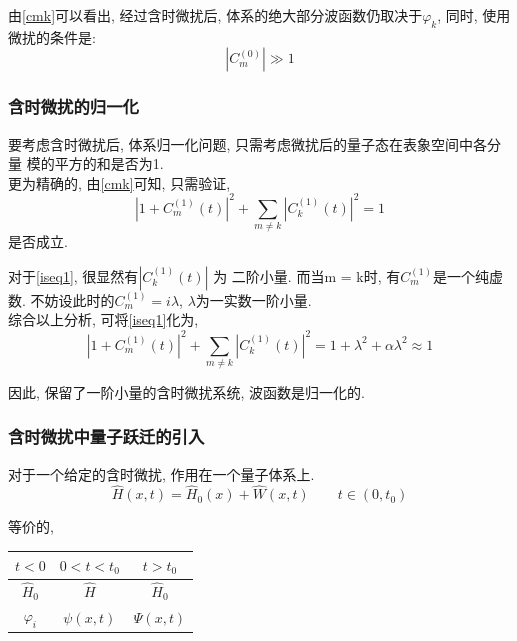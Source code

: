 \documentclass[a4paper, 11pt]{article}
\begin{document}
\begin{spacing}{1.2}
          由\eqref{cmk}可以看出, 经过含时微扰后, 体系的绝大部分波函数仍取决于$\varphi_k$,
          同时, 使用微扰的条件是:
          \begin{equation}
            |C_m^{(0)}| \gg 1
          \end{equation}
          
        \subsubsection{含时微扰的归一化}
          要考虑含时微扰后, 体系归一化问题, 只需考虑微扰后的量子态在表象空间中各分量
          模的平方的和是否为1.\\
          更为精确的, 由\eqref{cmk}可知, 只需验证,
          \begin{equation}
            \label{iseq1}
            |1+C_m^{(1)}(t)|^2 + \sum_{m\ne{}k}|C_k^{(1)}(t)|^2 = 1 
          \end{equation}
          是否成立.

          对于\eqref{iseq1}, 很显然有$|C_k^{(1)}(t)|$ 为 二阶小量. 
          而当m = k时, 有$C_m^{(1)}$是一个纯虚数.
          不妨设此时的$C_m^{(1)} = i\lambda$, $\lambda$为一实数一阶小量.\\
          综合以上分析, 可将\eqref{iseq1}化为, 
          \begin{equation}
            |1+C_m^{(1)}(t)|^2 + \sum_{m\ne{}k}|C_k^{(1)}(t)|^2
            = 1 + \lambda^2 + \alpha\lambda^2 
            \approx 1
          \end{equation}
          
          因此, 保留了一阶小量的含时微扰系统, 波函数是归一化的.
          
        \subsubsection{含时微扰中量子跃迁的引入}
          
          对于一个给定的含时微扰, 作用在一个量子体系上.
          \begin{equation}
            \hat{H}(x, t) = \hat{H}_0(x) + \hat{W}(x,t) 
                            \qquad t\in(0, t_0)
          \end{equation}
          
          等价的,
          \begin{center}
            \begin{tabular}{c|c|c}
              \hline
              $t<0$ &     $0<t<t_0  $      &   $t>t_0$ \\
              \hline 
              $\hat{H}_0$ & $\hat{H}$ & $\hat{H}_0$\\
              \hline 
              $\varphi_i$ & $\psi(x, t)$ & $\Psi(x, t)$\\
              \hline 
            \end{tabular}
          \end{center}
         

\end{spacing}
\end{document}
